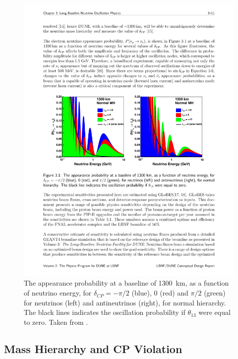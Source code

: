 \begin{figure}
  \centering
  \includegraphics[width=16cm]{DUNEAppearanceProbabilities.pdf}
  \caption{The appearance probability at a baseline of 1300~km, as a function of neutrino energy, for $\delta_{CP}=-\pi/2$ (blue), 0 (red) and $\pi/2$ (green) for neutrinos (left) and antineutrinos (right), for normal hierarchy.  The black lines indicates the oscillation probability if $\theta_{13}$ were equal to zero.  Taken from \cite{DUNECDR2}.}
  \label{fig:DUNEAppearanceProbabilities}
\end{figure}

\subsection{Mass Hierarchy and CP Violation}\label{sec:DUNEMassHierarchyCPViolation}

